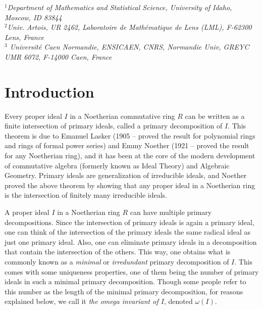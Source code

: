 \documentclass[11pt]{amsart}   %
\begin{document}
\date{}
\maketitle


\begin{center}
{\it
$^{1}$Department of Mathematics and Statistical Science, University of Idaho, Moscow, ID 83844 \\
$^{2}$Univ. Artois, UR 2462, Laboratoire de Math\'{e}matique de  Lens (LML),   F-62300 Lens, France \\
$^{3}$ Universit\'e  Caen Normandie, ENSICAEN, CNRS, Normandie Univ, GREYC UMR  6072, F-14000 Caen,  France
}
\end{center}






\section{Introduction}

Every proper ideal $I$ in a Noetherian commutative ring $R$ can be written as a finite intersection of primary ideals, called a primary decomposition of $I$. This theorem is due to Emanuel Lasker (1905 -- proved the result for polynomial rings and rings of formal power series) and Emmy Noether (1921 -- proved the result for any Noetherian ring), and it has been at the core of the modern development of commutative algebra (formerly known as Ideal Theory) and Algebraic Geometry. Primary ideals are generalization of irreducible ideals, and Noether proved the above theorem by showing that any proper ideal in a Noetherian ring is the intersection of finitely many irreducible ideals.

A proper ideal $I$ in a Noetherian ring $R$ can have multiple primary decompositions. Since the intersection of primary ideals is again a primary ideal, one can think of the intersection of the primary ideals the same radical ideal as just one primary ideal. Also, one can eliminate primary ideals in a decomposition that contain the intersection of the others. This way, one obtains what is commonly known as a {\em minimal} or {\em irredundant} primary decomposition of $I$. This comes with some uniqueness properties, one of them being the number of primary ideals in such a minimal primary decomposition. Though some people refer to this number as the length of the minimal primary decomposition, for reasons explained below, we call it {\em the omega invariant of $I$}, denoted $\omega(I)$.
\end{document}
